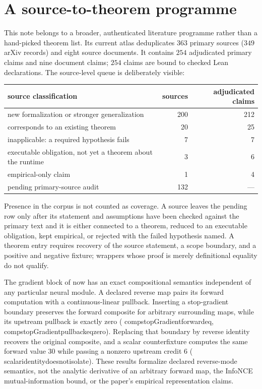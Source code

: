 \documentclass[11pt]{article}
\newcommand{\leanname}[1]{{\scriptsize\ttfamily
  \def\_{\textunderscore\allowbreak}#1}}
\begin{document}
\section{A source-to-theorem programme}
\label{sec:atlas}

This note belongs to a broader, authenticated literature programme rather than a
hand-picked theorem list. Its current atlas deduplicates $363$ primary sources
($349$ arXiv records) and eight source documents. It contains $254$ adjudicated primary
claims and nine document claims; $254$ claims are bound to checked Lean declarations.
The source-level queue is deliberately visible:

\begin{center}
\begin{tabular}{lrr}
\toprule
source classification & sources & adjudicated claims \\
\midrule
new formalization or stronger generalization & 200 & 212 \\
corresponds to an existing theorem & 20 & 25 \\
inapplicable: a required hypothesis fails & 7 & 7 \\
executable obligation, not yet a theorem about the runtime & 3 & 6 \\
empirical-only claim & 1 & 4 \\
pending primary-source audit & 132 & --- \\
\bottomrule
\end{tabular}
\end{center}

Presence in the corpus is not counted as coverage. A source leaves the pending row only
after its statement and assumptions have been checked against the primary text and it is
either connected to a theorem, reduced to an executable obligation, kept empirical, or
rejected with the failed hypothesis named. A theorem entry requires recovery of the
source statement, a scope boundary, and a positive and negative fixture; wrappers whose
proof is merely definitional equality do not qualify.

The gradient block of \cite{lowe2019gim} now has an exact compositional
semantics independent of any particular neural module.  A declared reverse map
pairs its forward computation with a continuous-linear pullback.  Inserting a
stop-gradient boundary preserves the forward composite for arbitrary
surrounding maps, while its upstream pullback is exactly zero
(\leanname{comp\_stopGradient\_forward\_eq},
\leanname{comp\_stopGradient\_pullback\_eq\_zero}).  Replacing that boundary by
reverse identity recovers the original composite, and a scalar counterfixture
computes the same forward value $30$ while passing a nonzero upstream credit
$6$ (\leanname{scalar\_identity\_does\_not\_isolate}).  These results
formalize declared reverse-mode semantics, not the analytic derivative of an
arbitrary forward map, the InfoNCE mutual-information bound, or the paper's
empirical representation claims.
\end{document}
